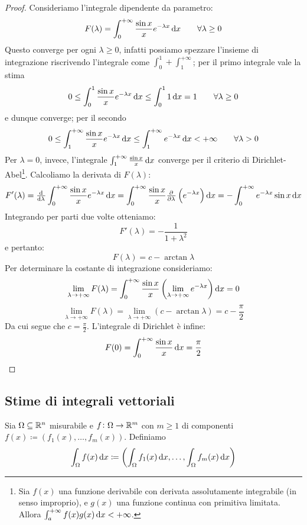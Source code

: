 \begin{proof}
	Consideriamo l'integrale dipendente da parametro:
	\[ F(\lambda) = \int_0^{+\infty} \frac{\sin x}{x} e^{-\lambda x} \dif{x} \qquad \forall\lambda \geq 0 \]
	Questo converge per ogni $ \lambda \geq 0 $, infatti possiamo spezzare l'insieme di integrazione riscrivendo l'integrale come $ \int_{0}^{1} + \int_{1}^{+\infty} $;
	per il primo integrale vale la stima
	\[ 0 \leq \int_{0}^{1} \frac{\sin x}{x} e^{-\lambda x} \dif{x} \leq \int_{0}^{1} 1 \dif{x} = 1 \qquad \forall\lambda\geq 0 \]
	e dunque converge; per il secondo
	\[ 0 \leq \int_{1}^{+\infty} \frac{\sin x}{x} e^{-\lambda x} \dif{x} \leq \int_{1}^{+\infty} e^{-\lambda x} \dif{x} < +\infty \qquad \forall\lambda > 0 \]
	Per $ \lambda = 0 $, invece, l'integrale $ \int_{1}^{+\infty} \frac{\sin x}{x} \dif{x} $ converge per il criterio di Dirichlet-Abel\footnote{ Sia $ f(x) $ una funzione derivabile con derivata assolutamente integrabile (in senso improprio), e $ g(x) $ una funzione continua con primitiva limitata. Allora $\int_{a}^{+\infty} f(x)g(x) \dif{x} < +\infty $. }.
	Calcoliamo la derivata di $ F(\lambda) $:
	\[ F'(\lambda) = \od{}{\lambda} \int_0^{+\infty} \frac{\sin x}{x} e^{-\lambda x} \dif{x} = \int_{0}^{+\infty} \frac{\sin x}{x} \pd{}{\lambda} \left( e^{-\lambda x} \right) \dif{x} = - \int_0^{+\infty}e^{-\lambda x} \sin x \dif{x} \]
	Integrando per parti due volte otteniamo:
	\[ F'(\lambda) = -\frac{1}{1+\lambda^2} \]
	e pertanto:
	\[ F(\lambda) = c - \arctan\lambda \]
	Per determinare la costante di integrazione consideriamo:
	\[ \lim_{\lambda\to+\infty} F(\lambda) = \int_{0}^{+\infty} \frac{\sin x}{x} \left( \lim_{\lambda\to+\infty} e^{-\lambda x} \right) \dif{x} = 0 \]
	\[ \lim_{\lambda\to+\infty} F(\lambda) = \lim_{\lambda\to+\infty} (c - \arctan\lambda) = c - \frac{\pi}{2}\]
	Da cui segue che $ c = \frac{\pi}{2} $. L'integrale di Dirichlet è infine:
	\[ F(0) = \int_0^{+\infty} \frac{\sin x}{x} \dif{x} = \frac{\pi}{2} \qedhere \] 
\end{proof}

\subsection{Stime di integrali vettoriali}

\begin{definition}
	Sia $ \Omega \subseteq \mathbb{R}^n $ misurabile e $ f \colon \Omega \to \mathbb{R}^m $ con $ m \geq 1 $ di componenti $ f(x) \coloneqq \left(f_1(x), \ldots, f_m(x)\right) $. Definiamo 
	\begin{equation}
		\int_{\Omega} f(x) \dif{x} \coloneqq \left(\int_{\Omega}f_1(x) \dif{x}, \ldots, \int_{\Omega}f_m(x) \dif{x}\right)
	\end{equation} 
\end{definition}

